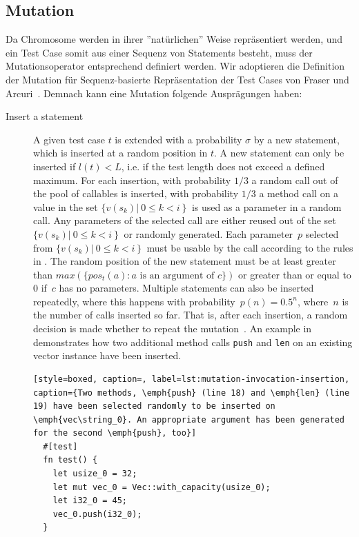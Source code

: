 \documentclass[paper=a4,%
  twoside,%
  BCOR4mm,%
  abstract=true,%
  toc=bibliography,%
  chapterprefix=true,%
  toc=bibliographynumbered,%
  open=right,%
  english,%
  pagesize=pdftex]{scrreprt}
\begin{document}
\subsection{Mutation}
Da Chromosome werden in ihrer ''natürlichen'' Weise repräsentiert werden, und ein Test Case somit aus einer Sequenz von Statements besteht, muss der Mutationsoperator entsprechend definiert werden. Wir adoptieren die Definition der Mutation für Sequenz-basierte Repräsentation der Test Cases von Fraser und Arcuri~\cite{Fraser2012}. Demnach kann eine Mutation folgende Ausprägungen haben:
\begin{description}
  \item[Insert a statement] A given test case $t$ is extended with a probability $\sigma$ by a new statement, which is inserted at a random position in $t$. A new statement can only be inserted if $l(t) < L$, i.e. if the test length does not exceed a defined maximum. For each insertion, with probability $1/3$ a random call out of the pool of callables is inserted, with probability $1/3$ a method call on a value in the set $\{v(s_k) \left|~0 \leq k < i \right\}$ is used as a parameter in a random call. Any parameters of the selected call are either reused out of the set $\{v(s_k) \left|~0 \leq k < i \right\}$ or randomly generated. Each parameter~$p$ selected from $\{v(s_k) \left|~0 \leq k < i \right\}$ must be usable by the call according to the rules in . The random position of the new statement must be at least greater than $max(\{pos_t(a) : a \text{ is an argument of } c\})$ or greater than or equal to $0$ if~$c$ has no parameters. Multiple statements can also be inserted repeatedly, where this happens with probability~$p(n) = 0.5^n$, where~$n$ is the number of calls inserted so far. That is, after each insertion, a random decision is made whether to repeat the mutation~\cite{Tonella2004}. An example in  demonstrates how two additional method calls \texttt{push} and \texttt{len} on an existing vector instance have been inserted. 

  \begin{lstlisting}[style=boxed, caption=, label=lst:mutation-invocation-insertion, caption={Two methods, \emph{push} (line 18) and \emph{len} (line 19) have been selected randomly to be inserted on \emph{vec\string_0}. An appropriate argument has been generated for the second \emph{push}, too}]
  #[test]
  fn test() {
    let usize_0 = 32;
    let mut vec_0 = Vec::with_capacity(usize_0);
    let i32_0 = 45;
    vec_0.push(i32_0);
  }


\end{lstlisting}
\end{description}
\end{document}
